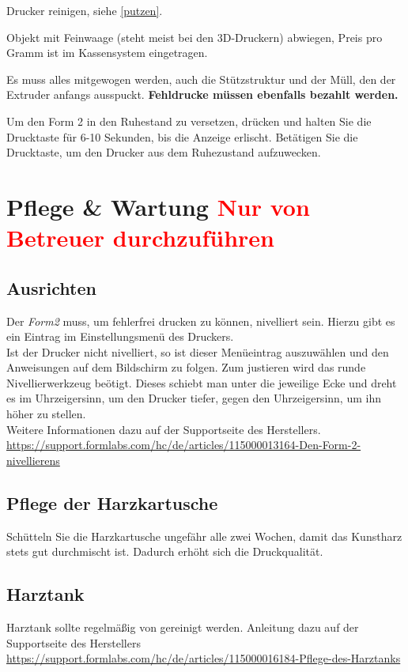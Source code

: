 \documentclass{\basedir/fablab-document}
\begin{document}
	Drucker reinigen, siehe \ref{putzen}.
	
	Objekt mit Feinwaage (steht meist bei den 3D-Druckern) abwiegen, Preis pro Gramm ist im Kassensystem eingetragen.
	
	Es muss alles mitgewogen werden, auch die Stützstruktur und der Müll, den der Extruder anfangs ausspuckt. \textbf{Fehldrucke müssen ebenfalls bezahlt werden.}
	
	 Um den Form 2 in den Ruhestand zu versetzen, drücken und halten Sie die Drucktaste für 6-10 Sekunden, bis die Anzeige erlischt. Betätigen Sie die Drucktaste, um den Drucker aus dem Ruhezustand aufzuwecken.
	\pagebreak
	

	\section{Pflege \& Wartung \textcolor{red}{Nur von Betreuer durchzuführen}}
	
	\subsection{Ausrichten}
	Der \textit{Form2} muss, um fehlerfrei drucken zu können, nivelliert sein. Hierzu gibt es ein Eintrag im Einstellungsmenü des Druckers.\\
	Ist der Drucker nicht nivelliert, so ist dieser Menüeintrag auszuwählen und den Anweisungen auf dem Bildschirm zu folgen. Zum justieren wird das runde Nivellierwerkzeug beötigt. Dieses schiebt man unter die jeweilige Ecke und dreht es im Uhrzeigersinn, um den Drucker tiefer, gegen den Uhrzeigersinn, um ihn höher zu stellen.\\
	Weitere Informationen dazu auf der Supportseite des Herstellers.	\\
	 \url{https://support.formlabs.com/hc/de/articles/115000013164-Den-Form-2-nivellierens}
	 
	 \subsection{Pflege der Harzkartusche}
	 Schütteln Sie die Harzkartusche ungefähr alle zwei Wochen, damit das Kunstharz stets gut durchmischt ist. Dadurch erhöht sich die Druckqualität.
	
	\subsection{Harztank}
		Harztank sollte regelmäßig von gereinigt werden. Anleitung dazu auf der Supportseite des Herstellers\\
		\url{https://support.formlabs.com/hc/de/articles/115000016184-Pflege-des-Harztanks}
		
\end{document}
